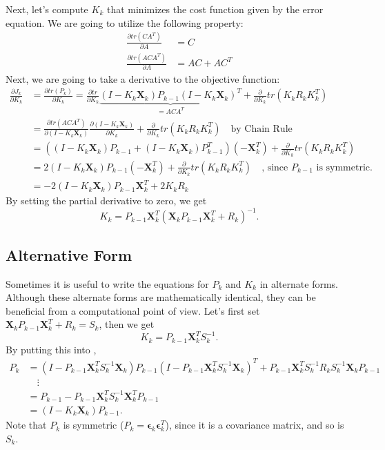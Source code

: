 Next, let's compute $K_k$ that minimizes the cost function given by the error equation. We are going to utilize the following property:
\begin{align*}
	\frac{\partial tr(CA^T)}{\partial A} &= C\\
	\frac{\partial tr(ACA^T)}{\partial A} &= AC + AC^T
\end{align*}
Next, we are going to take a derivative to the objective function:
\begin{align*}
	\frac{\partial J_k}{\partial K_k} &= \frac{\partial tr(P_k)}{\partial K_k} = \frac{\partial tr}{\partial K_k}\underbrace{(I-K_k \mathbf{X}_k)P_{k-1}(I-K_k \mathbf{X}_k)^T}_{=ACA^T}+\frac{\partial}{\partial K_k}tr\left(K_k R_k K_k^T\right)\\ 
									  &= \frac{\partial tr(ACA^T)}{\partial (I-K_k \mathbf{X}_k)}\frac{\partial (I-K_k \mathbf{X}_k)}{\partial K_k} +\frac{\partial}{\partial K_k}tr\left(K_k R_k K_k^T\right) \quad \text{by Chain Rule}\\
	&= \left((I-K_k \mathbf{X}_k)P_{k-1}+ (I-K_k \mathbf{X}_k)P_{k-1}^T\right)(-\mathbf{X}_k^T) + \frac{\partial}{\partial K_k}tr\left(K_k R_k K_k^T\right)\\
	&= 2(I-K_k \mathbf{X}_k)P_{k-1}(-\mathbf{X}_k^T) + \frac{\partial}{\partial K_k}tr\left(K_k R_k K_k^T\right)\quad \text{, since } P_{k-1} \text{ is symmetric.}\\
									  &= -2(I-K_k \mathbf{X}_k)P_{k-1}\mathbf{X}_k^T+2K_kR_k
\end{align*}
By setting the partial derivative to zero, we get
$$K_k = P_{k-1}\mathbf{X}_k^T(\mathbf{X}_kP_{k-1}\mathbf{X}_k^T+R_k)^{-1}.$$

\subsection{Alternative Form}
Sometimes it is useful to write the equations for $P_k$ and $K_k$ in alternate forms. Although these alternate forms are mathematically identical, they can be beneficial from a computational point of view. Let's first set $\mathbf{X}_kP_{k-1}\mathbf{X}_k^T+R_k = S_k$, then we get 
$$K_k = P_{k-1}\mathbf{X}_k^TS_k^{-1}.$$
By putting this into ,
\begin{align*}
	P_k &= (I-P_{k-1}\mathbf{X}_k^TS_k^{-1} \mathbf{X}_k)P_{k-1}(I-P_{k-1}\mathbf{X}_k^TS_k^{-1} \mathbf{X}_k)^T+P_{k-1}\mathbf{X}_k^TS_k^{-1} R_k S_k^{-1}\mathbf{X}_kP_{k-1}\\ 
		&\quad \vdots\\
		&= P_{k-1}-P_{k-1}\mathbf{X}_k^TS_k^{-1}\mathbf{X}_k^TP_{k-1}\\
		&= (I-K_k\mathbf{X}_k)P_{k-1}.
\end{align*}
Note that $P_k$ is symmetric (\cf $P_k=\boldsymbol{\epsilon}_{k}\boldsymbol{\epsilon}_{k}^T$), since it is a covariance matrix, and so is $S_k$.

